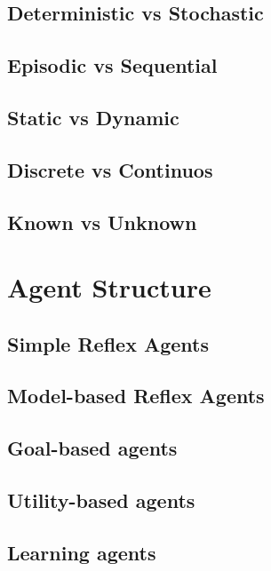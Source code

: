 \subsection{Deterministic vs Stochastic}
\subsection{Episodic vs Sequential}
\subsection{Static vs Dynamic}
\subsection{Discrete vs Continuos}
\subsection{Known vs Unknown}

\section{Agent Structure}
\subsection{Simple Reflex Agents}
\subsection{Model-based Reflex Agents}
\subsection{Goal-based agents}
\subsection{Utility-based agents}
\subsection{Learning agents}

